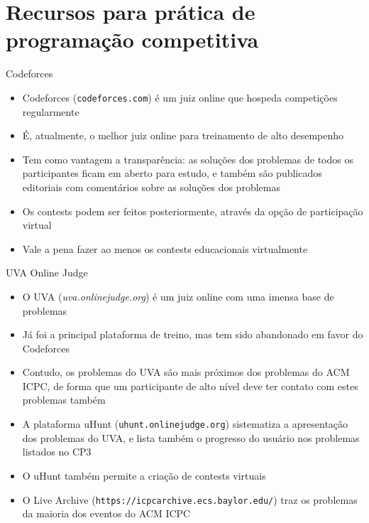 \section{Recursos para prática de programação competitiva}

\begin{frame}[fragile]{Codeforces}

    \begin{itemize}
        \item Codeforces (\texttt{codeforces.com}) é um juiz online que hospeda competições
            regularmente

        \item É, atualmente, o melhor juiz online para treinamento de alto desempenho

        \item Tem como vantagem a transparência: as soluções dos problemas de todos os
            participantes ficam em aberto para estudo, e também são publicados editoriais
            com comentários sobre as soluções dos problemas

        \item Os contests podem ser feitos posteriormente, através da opção de participação
            virtual

        \item Vale a pena fazer ao menos os contests educacionais virtualmente

    \end{itemize}

\end{frame}

\begin{frame}[fragile]{UVA Online Judge}

    \begin{itemize}
        \item O UVA (\textit{uva.onlinejudge.org}) é um juiz online com uma imensa base de
            problemas

        \item Já foi a principal plataforma de treino, mas tem sido abandonado em favor do
            Codeforces

        \item Contudo, os problemas do UVA são mais próximos dos problemas do ACM ICPC,
            de forma que um participante de alto nível deve ter contato com estes problemas
            também

        \item A plataforma uHunt (\texttt{uhunt.onlinejudge.org}) sistematiza a apresentação
            dos problemas do UVA, e lista também o progresso do usuário nos problemas listados
            no CP3

        \item O uHunt também permite a criação de contests virtuais

        \item O Live Archive (\texttt{https://icpcarchive.ecs.baylor.edu/}) traz os problemas
            da maioria dos eventos do ACM ICPC
    \end{itemize}

\end{frame}
